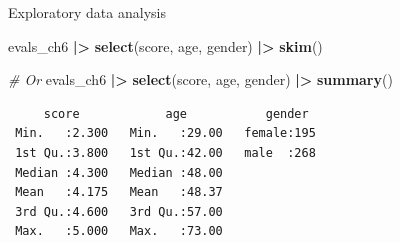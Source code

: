 \documentclass[
  ignorenonframetext,
]{beamer}
\newenvironment{Shaded}{\begin{snugshade}}{\end{snugshade}}
\newcommand{\CommentTok}[1]{\textcolor[rgb]{0.56,0.35,0.01}{\textit{#1}}}
\newcommand{\FunctionTok}[1]{\textcolor[rgb]{0.13,0.29,0.53}{\textbf{#1}}}
\newcommand{\NormalTok}[1]{#1}
\newcommand{\SpecialCharTok}[1]{\textcolor[rgb]{0.81,0.36,0.00}{\textbf{#1}}}
\begin{document}
\begin{frame}[fragile]{Exploratory data analysis}
\protect\hypertarget{exploratory-data-analysis-10}{}
\normalsize

\begin{Shaded}
\begin{Highlighting}[]
\NormalTok{evals\_ch6 }\SpecialCharTok{|\textgreater{}} 
  \FunctionTok{select}\NormalTok{(score, age, gender) }\SpecialCharTok{|\textgreater{}} 
  \FunctionTok{skim}\NormalTok{()}
\end{Highlighting}
\end{Shaded}

\normalsize

\begin{Shaded}
\begin{Highlighting}[]
\CommentTok{\# Or}
\NormalTok{evals\_ch6 }\SpecialCharTok{|\textgreater{}} 
  \FunctionTok{select}\NormalTok{(score, age, gender) }\SpecialCharTok{|\textgreater{}} 
  \FunctionTok{summary}\NormalTok{()}
\end{Highlighting}
\end{Shaded}

\begin{verbatim}
     score            age           gender   
 Min.   :2.300   Min.   :29.00   female:195  
 1st Qu.:3.800   1st Qu.:42.00   male  :268  
 Median :4.300   Median :48.00               
 Mean   :4.175   Mean   :48.37               
 3rd Qu.:4.600   3rd Qu.:57.00               
 Max.   :5.000   Max.   :73.00               
\end{verbatim}
\end{frame}
\end{document}
